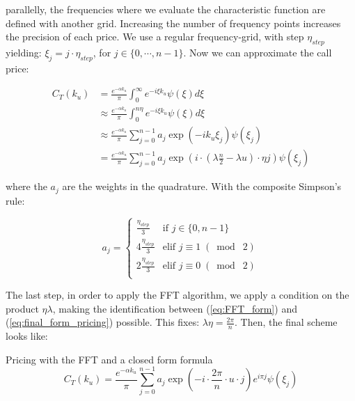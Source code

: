 parallelly, the frequencies where we evaluate the characteristic function are defined with another grid. Increasing the number of frequency points increases the precision of each price. We use a regular frequency-grid, with step $\eta_{step}$ yielding: $ \xi_j =j \cdot  \eta_{step}$, for $j \in \{ 0, \cdots, n-1 \} $. Now we can approximate the call price:


\begin{align}
C_T(k_u) &= \frac{ e^{- \alpha k_u }} {  \pi } \int_0^{\infty} e^{-i \xi k_u } \psi( \xi ) d \xi  \nonumber \\
& \approx \frac{ e^{- \alpha k_u }} {  \pi } \int_0^{ n \eta } e^{-i \xi k_u } \psi( \xi ) d \xi   \label{eq:truncation} \\
&\approx \frac{ e^{- \alpha k_u }} {  \pi } \sum_{j=0}^{n-1} 
a_j \exp \left ( - i k_u \xi_j \right )  \psi(\xi_j)   \label{eq:discrete} \\
& =  \frac{ e^{- \alpha k_u }} {  \pi } \sum_{j=0}^{n-1} 
a_j \exp \left ( 
i \cdot ( \lambda \frac n 2 - \lambda u ) \cdot \eta j 
\right )  \psi(\xi_j) 
\label{eq:final_form_pricing}
\end{align}

where the $a_j$ are the weights in the quadrature. With the composite Simpson's rule:

$$
a_j = \left\{
    \begin{array}{lll}
        \frac{ \eta_{step} } 3 & \mbox{if } j \in \{0,n-1 \}  \\
        4 \frac{  \eta_{step} } 3 & \mbox{elif } j \equiv 1 \;(\bmod\; 2) \\
        2 \frac{ \eta_{step} } 3 & \mbox{elif } j \equiv 0 \;(\bmod\; 2) \\
    \end{array}
\right.
$$

The last step, in order to apply the FFT algorithm, we apply a condition on the product $ \eta \lambda $, making the identification between (\ref{eq:FFT_form}) and (\ref{eq:final_form_pricing}) possible. This fixes: $ \lambda \eta = \frac {2 \pi } n $. Then, the final scheme looks like:

\begin{theoreme}{Pricing with the FFT and a closed form formula }
\begin{equation}
\label{eq:final_form_pricing_final}
C_T(k_u) = \frac{ e^{- \alpha k_u }} {  \pi } \sum_{j=0}^{n-1} 
a_j \exp \left ( 
- i \cdot \frac{2 \pi} {n} \cdot  u  \cdot   j 
\right ) 
e^{ i \pi  j }
\psi(\xi_j) 
\end{equation}
\end{theoreme}

